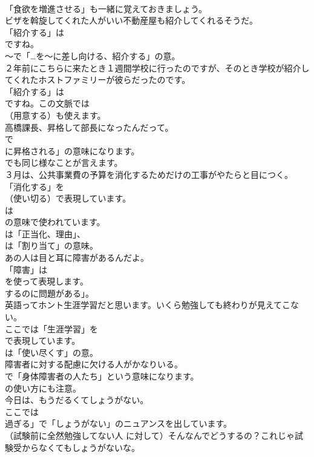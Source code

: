 \documentclass[8pt]{extreport}
\begin{document}
\begin{CJK}{UTF8}{min}
\\	「食欲を増進させる」も一緒に覚えておきましょう。	
\\	ビザを斡旋してくれた人がいい不動産屋も紹介してくれるそうだ。 
\\	「紹介する」は
\\	ですね。
\\	～で「…を～に差し向ける、紹介する」の意。	
\\	２年前にこちらに来たとき１週間学校に行ったのですが、そのとき学校が紹介してくれたホストファミリーが彼らだったのです。 
\\	「紹介する」は 
\\	ですね。この文脈では 
\\	（用意する）も使えます。	
\\	高橋課長、昇格して部長になったんだって。 
\\	で
\\	に昇格される」の意味になります。
\\	でも同じ様なことが言えます。	
\\	３月は、公共事業費の予算を消化するためだけの工事がやたらと目につく。 
\\	「消化する」を
\\	（使い切る）で表現しています。
\\	は 
\\	の意味で使われています。
\\	は「正当化、理由」、
\\	は「割り当て」の意味。	
\\	あの人は目と耳に障害があるんだよ。 
\\	「障害」は
\\	を使って表現します。
\\	するのに問題がある」。	
\\	英語ってホント生涯学習だと思います。いくら勉強しても終わりが見えてこない。 
\\	ここでは「生涯学習」を 
\\	で表現しています。
\\	は「使い尽くす」の意。	
\\	障害者に対する配慮に欠ける人がかなりいる。 
\\	で「身体障害者の人たち」という意味になります。
\\	の使い方にも注意。	
\\	今日は、もうだるくてしょうがない。 
\\	ここでは
\\	過ぎる」で「しょうがない」のニュアンスを出しています。	
\\	（試験前に全然勉強してない人 に対して）そんなんでどうするの？これじゃ試験受からなくてもしょうがないな。 

\end{CJK}
\end{document}
